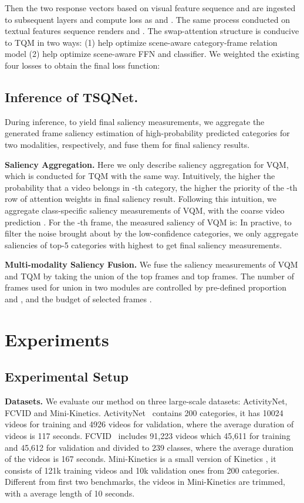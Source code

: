 \documentclass[runningheads]{llncs}
\begin{document}
Then the two response vectors based on visual feature sequence  and  are ingested to subsequent layers and compute loss as  and . The same process conducted on textual features sequence renders  and . 
The swap-attention structure is conducive to TQM in two ways: (1)  help optimize scene-aware category-frame relation model (2)  help optimize scene-aware FFN and classifier. 
We weighted the existing four losses to obtain the final loss function:
\label{loss}


\subsection{Inference of TSQNet.}\label{inference}
During inference, to yield final saliency measurements, we  aggregate the generated frame saliency estimation of high-probability predicted categories for two modalities, respectively, and fuse them for final saliency results. 


\noindent \textbf{Saliency Aggregation.}
Here we only describe saliency aggregation for VQM, which is conducted for TQM with the same way. Intuitively, the higher the probability that a video belongs in -th category, the higher the priority of the -th row of attention weights in final saliency result. Following this intuition, we aggregate class-specific saliency measurements of VQM,  with the coarse video prediction . For the -th frame, the measured saliency of VQM is:
\label{reweight1}
In practive, to filter the noise brought about by the low-confidence categories, we only aggregate saliencies of top-5 categories with highest  to get final saliency measurements.


\noindent\textbf{Multi-modality Saliency Fusion.}
We fuse the saliency measurements of VQM and TQM by taking the union of the top  frames and top  frames. The number of frames used for union in two modules are controlled by pre-defined proportion  and , and the budget of selected frames .

\section{Experiments}
\subsection{Experimental Setup}
\label{exp:setup}
\noindent \textbf{Datasets.}
We evaluate our method on three large-scale datasets: ActivityNet, FCVID and Mini-Kinetics.  
ActivityNet~\cite{caba2015activitynet} contains 200 categories, it has 10024 videos for training and 4926 videos for validation, where the average duration of videos is 117 seconds.
FCVID~\cite{fcvid} includes 91,223 videos which 45,611 for training and 45,612 for validation and divided to 239 classes, where the average duration of the videos is 167 seconds.
Mini-Kinetics is a small version of Kinetics \cite{kay2017kinetics}, it consists of 121k training videos and 10k validation ones from 200 categories. Different from first two benchmarks, the videos in Mini-Kinetics are trimmed, with a average length of 10 seconds.
\end{document}
